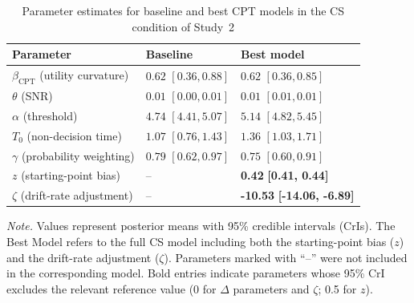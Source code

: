 \documentclass[man,floatsintext]{apa7}
\begin{document}
\begin{table}[!htbp]
\centering
\begin{threeparttable}\small
\caption{Parameter estimates for baseline and best CPT models in the CS condition of Study~2}
\label{tab:cpt_pe_cs_study2}
\begin{tabularx}{\linewidth}{@{} >{\raggedright\arraybackslash}p{6cm} >{\centering\arraybackslash}X >{\centering\arraybackslash}X @{}}
\toprule
\textbf{Parameter} & \textbf{Baseline} & \textbf{Best model} \\
\midrule
$\beta_{\text{CPT}}$ (utility curvature) & $0.62$ $[0.36, 0.88]$ & $0.62$ $[0.36, 0.85]$ \\
$\theta$ (SNR) & $0.01$ $[0.00, 0.01]$ & $0.01$ $[0.01, 0.01]$ \\
$\alpha$ (threshold) & $4.74$ $[4.41, 5.07]$ & $5.14$ $[4.82, 5.45]$ \\
$T_0$ (non-decision time) & $1.07$ $[0.76, 1.43]$ & $1.36$ $[1.03, 1.71]$ \\
$\gamma$ (probability weighting) & $0.79$ $[0.62, 0.97]$ & $0.75$ $[0.60, 0.91]$ \\
$z$ (starting-point bias) & -- & \textbf{0.42} \textbf{[0.41, 0.44]} \\
$\zeta$ (drift-rate adjustment) & -- & \textbf{-10.53} \textbf{[-14.06, -6.89]} \\
\bottomrule
\end{tabularx}
\begin{tablenotes}
\item \textit{Note.} Values represent posterior means with 95\% credible intervals (CrIs). The Best Model refers to the full CS model including both the starting-point bias ($z$) and the drift-rate adjustment ($\zeta$). Parameters marked with ``--'' were not included in the corresponding model. Bold entries indicate parameters whose 95\% CrI excludes the relevant reference value (0 for $\Delta$ parameters and $\zeta$; 0.5 for $z$).
\end{tablenotes}
\end{threeparttable}
\end{table}
\end{document}
